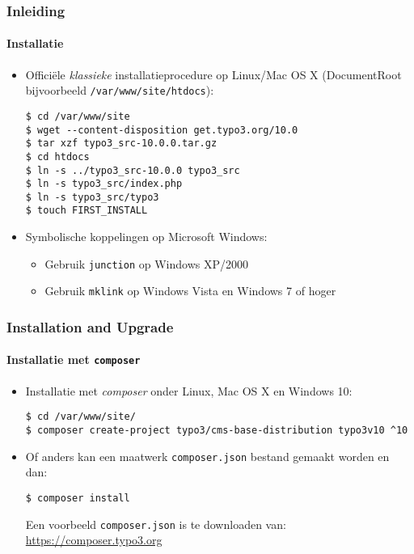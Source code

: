 
\begin{frame}[fragile]
	\frametitle{Inleiding}
	\framesubtitle{Installatie}

	\begin{itemize}
		\item Offici\"ele \textit{klassieke} installatieprocedure op Linux/Mac OS X\newline
		(DocumentRoot bijvoorbeeld \texttt{/var/www/site/htdocs}):
		\begin{lstlisting}
$ cd /var/www/site
$ wget --content-disposition get.typo3.org/10.0
$ tar xzf typo3_src-10.0.0.tar.gz
$ cd htdocs
$ ln -s ../typo3_src-10.0.0 typo3_src
$ ln -s typo3_src/index.php
$ ln -s typo3_src/typo3
$ touch FIRST_INSTALL
		\end{lstlisting}

		\item Symbolische koppelingen op Microsoft Windows:

			\begin{itemize}
				\item Gebruik \texttt{junction} op Windows XP/2000
				\item Gebruik \texttt{mklink} op Windows Vista en Windows 7 of hoger
			\end{itemize}

	\end{itemize}
\end{frame}


\begin{frame}[fragile]
	\frametitle{Installation and Upgrade}
	\framesubtitle{Installatie met \texttt{composer}}

	\begin{itemize}
		\item Installatie met \textit{composer} onder Linux, Mac OS X en Windows 10:

			\begin{lstlisting}
$ cd /var/www/site/
$ composer create-project typo3/cms-base-distribution typo3v10 ^10
			\end{lstlisting}

		\item Of anders kan een maatwerk \texttt{composer.json} bestand gemaakt worden en dan:

			\begin{lstlisting}
$ composer install
			\end{lstlisting}

			Een voorbeeld \texttt{composer.json} is te downloaden van:\newline
			\smaller
				\href{https://composer.typo3.org}{https://composer.typo3.org}
			\normalsize

	\end{itemize}
\end{frame}

